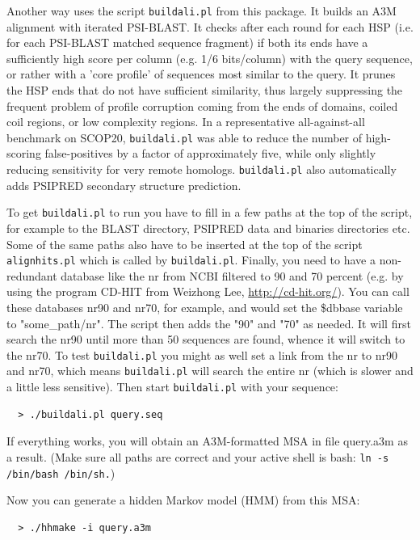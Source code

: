 \documentclass[11pt,a4paper]{article}
\begin{document}
Another way uses the script \verb`buildali.pl` from this package. It builds an A3M alignment 
with iterated PSI-BLAST. It checks after each round for each HSP (i.e. for each PSI-BLAST 
matched sequence fragment) if both its ends have a sufficiently high score per column 
(e.g. 1/6 bits/column) with the query sequence, or rather with a 'core profile' of sequences 
most similar to the query. It prunes the HSP ends that do not have sufficient similarity, 
thus largely suppressing the frequent problem of profile corruption coming from the ends of 
domains, coiled coil regions, or low complexity regions. In a representative all-against-all 
benchmark on SCOP20, \verb`buildali.pl` was able to reduce the number of high-scoring 
false-positives by a factor of approximately five, while only slightly reducing sensitivity 
for very remote homologs. \verb`buildali.pl` also automatically adds PSIPRED secondary structure 
prediction. 

To get \verb`buildali.pl` to run you have to fill in a few paths at the top of the script, 
for example to the BLAST directory, PSIPRED data and binaries directories etc. Some of 
the same paths also have to be inserted at the top of the script \verb`alignhits.pl` which 
is called by \verb`buildali.pl`. Finally, you need to have a non-redundant database like the 
nr from NCBI filtered to 90 and 70 percent (e.g. by using the program CD-HIT from 
Weizhong Lee, \url{http://cd-hit.org/}). You can call these databases nr90 and nr70, for 
example, and would set the \$dbbase variable to "some\_path/nr". The script then adds 
the "90" and "70" as needed. It will first search the nr90 until more than 50 
sequences are found, whence it will switch to the nr70. To test \verb`buildali.pl` you might 
as well set a link from the nr to nr90 and nr70, which means \verb`buildali.pl` will search 
the entire nr (which is slower and a little less sensitive). Then start \verb`buildali.pl` 
with your sequence:
\begin{verbatim}
  > ./buildali.pl query.seq
\end{verbatim}

If everything works, you will obtain an A3M-formatted MSA in file query.a3m 
as a result. (Make sure all paths are correct and your active shell is bash: 
\verb`ln -s /bin/bash /bin/sh.`)

Now you can generate a hidden Markov model (HMM) from this MSA:
\begin{verbatim}
  > ./hhmake -i query.a3m
\end{verbatim}
\end{document}
